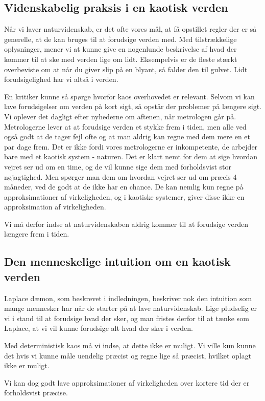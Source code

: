 \documentclass[12pt,a4paper]{article}
\theoremstyle{break}
\theoremstyle{nonumberplain}
\begin{document}
\subsection{Videnskabelig praksis i en kaotisk verden}
Når vi laver naturvidenskab, er det ofte vores mål, at få opstillet regler der er så generelle, at de kan bruges til at forudsige verden med. 
Med tilstrækkelige oplysninger, mener vi at kunne give en nogenlunde beskrivelse af hvad der kommer til at ske med verden lige om lidt.
Eksempelvis er de fleste stærkt overbeviste om at når du giver slip på en blyant, så falder den til gulvet. 
Lidt forudsigelighed har vi altså i verden. 

En kritiker kunne så spørge hvorfor kaos overhovedet er relevant. 
Selvom vi kan lave forudsigelser om verden på kort sigt, så opstår der problemer på længere sigt. 
Vi oplever det dagligt efter nyhederne om aftenen, når metrologen går på. 
Metrologerne lever at at forudsige verden et stykke frem i tiden, men alle ved også godt at de tager fejl ofte og at man aldrig kan regne med dem mere en et par dage frem. 
Det er ikke fordi vores metrologerne er inkompetente, de arbejder bare med et kaotisk system - naturen.
Det er klart nemt for dem at sige hvordan vejret ser ud om en time, og de vil kunne sige dem med forholdsvist stor nøjagtighed.
Men spørger man dem om hvordan vejret ser ud om præcis 4 måneder, ved de godt at de ikke har en chance. 
De kan nemlig kun regne på approksimationer af virkeligheden, og i kaotiske systemer, giver disse ikke en approksimation af virkeligheden.

Vi må derfor indse at naturvidenskaben aldrig kommer til at forudsige verden længere frem i tiden. 

\subsection{Den menneskelige intuition om en kaotisk verden}
Laplace dæmon, som beskrevet i indledningen, beskriver nok den intuition som mange mennesker har når de starter på at lave naturvidenskab.
Lige pludselig er vi i stand til at forudsige hvad der sker, og man fristes derfor til at tænke som Laplace, at vi vil kunne forudsige alt hvad der sker i verden.

Med deterministisk kaos må vi indse, at dette ikke er muligt. 
Vi ville kun kunne det hvis vi kunne måle uendelig præcist og regne lige så præcist, hvilket oplagt ikke er muligt.

Vi kan dog godt lave approksimationer af virkeligheden over kortere tid der er forholdsvist præcise. 
\end{document}
